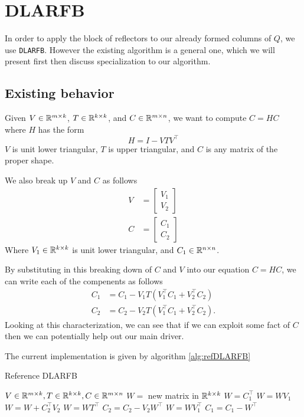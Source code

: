 \documentclass[12pt]{article}
\begin{document}
    \section{DLARFB}
    In order to apply the block of reflectors to our already formed columns of $Q$, we use \verb|DLARFB|.
    However the existing algorithm is a general one, which we will present first then discuss 
    specialization to our algorithm.
    \subsection{Existing behavior}
        Given $V\in\mathbb{R}^{m\times k}$, $T\in\mathbb{R}^{k\times k}$, and $C\in\mathbb{R}^{m\times n}$, we 
        want to compute $C = HC$ where $H$ has the form
        $$
        H = I - VTV^\top
        $$
        $V$ is unit lower triangular, $T$ is upper triangular, and $C$ is any matrix of the proper shape. 

        We also break up $V$ and $C$ as follows
        \begin{align}
            V &= \begin{bmatrix} V_1 \\ V_2 \end{bmatrix} \label{eq:vMatVert} \\
            C &= \begin{bmatrix} C_1 \\ C_2 \end{bmatrix} \label{eq:cMatVert}
        \end{align}
        Where $V_1\in\mathbb{R}^{k\times k}$ is unit lower triangular, and $C_1\in\mathbb{R}^{n\times n}$.

        By substituting in this breaking down of $C$ and $V$ into our equation $C = HC$, we can write each of the
        compenents as follows
        \begin{align*}
            C_1 &= C_1 - V_1T\left(V_1^\top C_1 + V_2^\top C_2\right) \\
            C_2 &= C_2 - V_2T\left(V_1^\top C_1 + V_2^\top C_2\right).
        \end{align*}
        Looking at this characterization, we can see that if we can exploit some fact of $C$ then we 
        can potentially help out our main driver.

        The current implementation is given by algorithm \ref{alg:refDLARFB}
        \begin{algorithm}
            \caption{Reference DLARFB}\label{alg:refDLARFB}
            \begin{algorithmic}[1]
                \REQUIRE $V\in\mathbb{R}^{m\times k}, T\in\mathbb{R}^{k\times k}, C\in\mathbb{R}^{m\times n}$
                \STATE $W = $ new matrix in $\mathbb{R}^{k\times k}$
                \STATE $W = C_1^\top$
                \STATE $W = WV_1$
                \STATE $W = W + C_2^\top V_2$
                \STATE $W = WT^\top$
                \STATE $C_2 = C_2 - V_2W^\top$
                \STATE $W = WV_1^\top$
                \STATE $C_1 = C_1 - W^\top$
            \end{algorithmic}
        \end{algorithm}
        
\end{document}
